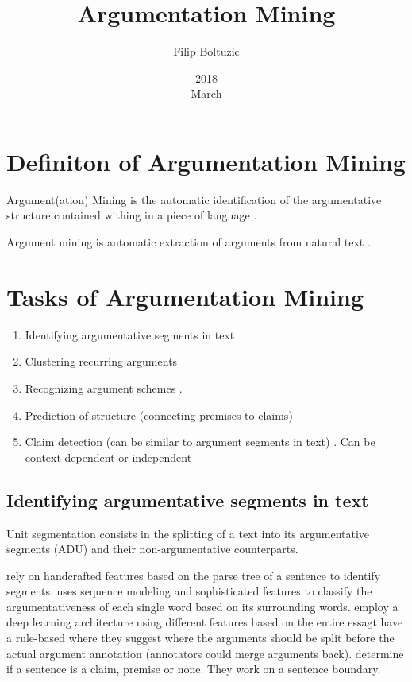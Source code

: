 \documentclass[a4paper,10pt]{article}
\title{Argumentation Mining}
\author{Filip Boltuzic}
\date{2018 \\ March}
\begin{document}
\maketitle

\section{Definiton of Argumentation Mining}

Argument(ation) Mining is the automatic identification of the argumentative
structure contained withing in a piece of language \cite{Lawrence2017}.

Argument mining is automatic extraction of arguments from natural text
\cite{Aker2017}.

\section{Tasks of Argumentation Mining}

\begin{enumerate}
  \item Identifying argumentative segments in text \cite{Ajjour2017, stab2017argumentative}

  \item Clustering recurring arguments \cite{boltuvzic2015identifying,
   misra2017using} 
   
  \item Recognizing argument schemes \cite{feng2011classifying}. 

  \item Prediction of structure (connecting premises to claims) \cite{Aker2017,
   Lawrence2017}

 \item Claim detection (can be similar to argument segments in text) \cite{Levy2017}. 
   Can be context dependent \cite{levy2014context} or independent \cite{lippi2015context}
   
\end{enumerate}

\subsection{Identifying argumentative segments in text}

Unit segmentation consists in the splitting of a text into its
argumentative segments (ADU) and their non-argumentative counterparts.
\cite{Ajjour2017} 

\cite{persing2016end} rely on handcrafted features based on the parse tree
of a sentence to identify segments. 
\cite{stab2017argumentative} uses sequence modeling and sophisticated
features to classify the argumentativeness of each single word based on
its surrounding words. 
\cite{eger2017neural} employ a deep learning architecture using different
features based on the entire essagt
\cite{al2016news} have a rule-based where they suggest where the arguments
should be split before the actual argument annotation (annotators could
merge arguments back).
\cite{Aker2017} determine if a sentence is a claim,
premise or none. They work on a sentence boundary. 
\end{document}
